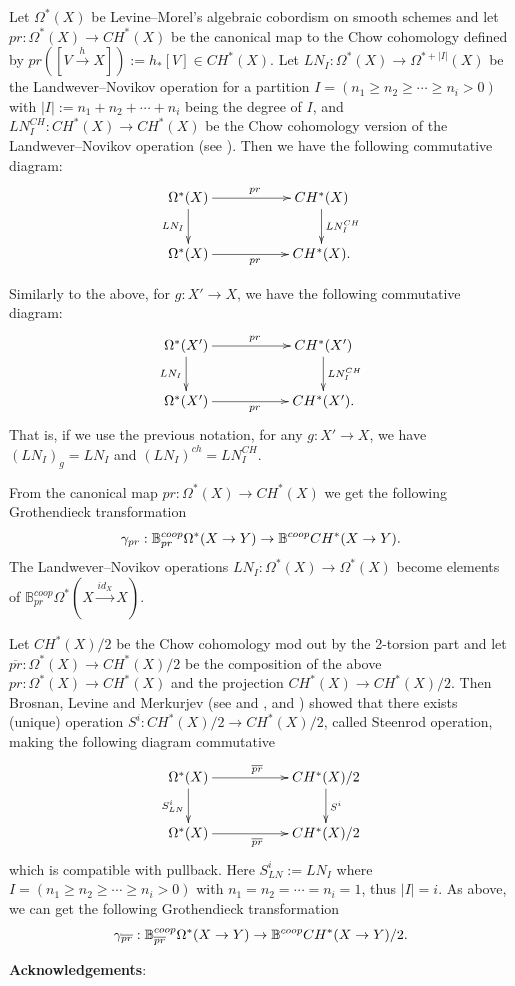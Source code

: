 \documentclass[a4paper]{amsart}
\begin{document}
\begin{ex} Let $\Omega^*(X)$ be Levine--Morel's algebraic cobordism on smooth schemes and let $pr: \Omega^*(X) \to CH^*(X)$ be the canonical map to the Chow cohomology defined by $pr([V \xrightarrow h X]):=h_*[V] \in CH^*(X)$. Let $LN_I: \Omega^*(X) \to \Omega^{* + |I|}(X)$ be the Landwever--Novikov operation for a partition $I = (n_1 \geq n_2 \geq \cdots \geq n_i>0)$ with $|I|:=n_1 + n_2 + \cdots + n_i$ being the degree of $I$, and $LN^{CH}_I: CH^*(X) \to CH^*(X)$ be the Chow cohomology version of the Landwever--Novikov operation (see \cite[\S 3]{Zain}). Then we have the following commutative diagram:
$$
\xymatrix
{
\Omega^*(X)  \ar[d]_{LN_I}\ar[rr]^{pr}  && CH^*(X) \ar[d]^{LN^{CH}_I}\\
\Omega^*(X)\ar[rr]_{pr} && CH^*(X).
}
$$

Similarly to the above, for $g:X' \to X$, we have the following commutative diagram:
$$
\xymatrix
{
\Omega^*(X')  \ar[d]_{LN_I}\ar[rr]^{pr}  && CH^*(X') \ar[d]^{LN^{CH}_I}\\
\Omega^*(X')\ar[rr]_{pr} && CH^*(X').
}
$$
That is, if we use the previous notation, for any $g:X' \to X$, we have $(LN_I)_g = LN_I$ and $(LN_I)^{ch} = LN^{CH}_I$.

From the canonical map $pr: \Omega^*(X) \to CH^*(X)$ we get the following Grothendieck transformation
$$\gamma_{pr}: \mathbb B^{coop}_{pr} \Omega^*(X \to Y)  \to  \mathbb B^{coop} CH^*(X \to Y).$$
The Landwever--Novikov operations $LN_I: \Omega^*(X) \to \Omega^*(X)$ become elements of $\mathbb B^{coop}_{pr} \Omega^*(X \xrightarrow {id_X} X)$.  
\end{ex}
\begin{ex}\label{LN} Let $CH^*(X)/2$ be the Chow cohomology mod out by the 2-torsion part and
let $\overline{pr}:\Omega^*(X) \to CH^*(X)/2$ be the composition of the above $pr:\Omega^*(X) \to CH^*(X)$ and the projection $CH^*(X) \to CH^*(X)/2$. Then Brosnan, Levine and Merkurjev (see \cite{Vishik} and \cite{Bros}, \cite{Levine} and \cite{Merk} ) showed that there exists (unique) operation $S^i:CH^*(X)/2 \to CH^*(X)/2$, called Steenrod operation, making the following diagram commutative
$$
\xymatrix
{
\Omega^*(X)  \ar[d]_{S^i_{LN}}\ar[rr]^{\overline{pr}}  && CH^*(X)/2 \ar[d]^{S^i}\\
\Omega^*(X)\ar[rr]_{\overline{pr}} && CH^*(X)/2
}
$$
which is compatible with pullback. Here $S^i_{LN} := LN_I$ where  $I = (n_1 \geq n_2 \geq \cdots \geq n_i>0)$ with $n_1 =n_2 = \cdots =n_i=1$, thus $|I|=i$.
As above, we can get the following Grothendieck transformation
$$\gamma_{\overline{pr}}: \mathbb B^{coop}_{\overline{pr}} \Omega^*(X \to Y)  \to  \mathbb B^{coop} CH^*(X \to Y)/2.$$
\end{ex}
\vspace{0.5cm}
\noindent
{\bf Acknowledgements}:
\end{document}
